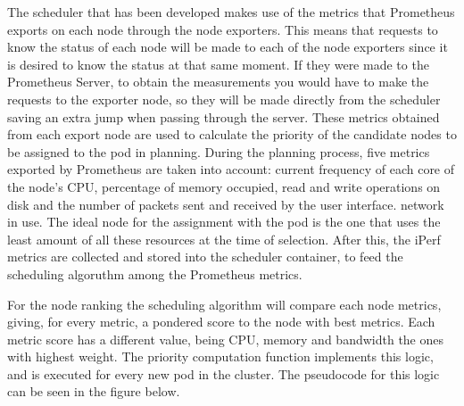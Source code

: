 \documentclass[conference]{IEEEtran}
\begin{document}
The scheduler that has been developed makes use of the metrics that Prometheus exports on each node through the node exporters.
This means that requests to know the status of each node will be made to each of the node exporters since it is desired to know
the status at that same moment. If they were made to the Prometheus Server, to obtain the measurements you would have to make the 
requests to the exporter node, so they will be made directly from the scheduler saving an extra jump when passing through the server.
These metrics obtained from each export node are used to calculate the priority of the candidate nodes to be assigned to the pod
in planning. During the planning process, five metrics exported by Prometheus are taken into account: current frequency of each core
of the node's CPU, percentage of memory occupied, read and write operations on disk and the number of packets sent and received by the
user interface. network in use. The ideal node for the assignment with the pod is the one that uses the least amount of all these
resources at the time of selection. After this, the iPerf metrics are collected and stored into the scheduler container, to feed
the scheduling algoruthm among the Prometheus metrics.


For the node ranking the scheduling algorithm will compare each node metrics, giving, for every metric, a pondered score to the node
with best metrics. Each metric score has a different value, being CPU, memory and bandwidth the ones with highest weight.
The priority computation function implements this logic, and is executed for every new pod in the cluster.
The pseudocode for this logic can be seen in the figure below.
\end{document}
